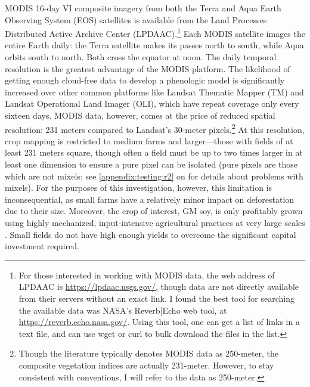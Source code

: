 MODIS 16-day VI composite imagery from both the Terra and Aqua Earth Observing System (EOS) satellites is available from the Land Processes Distributed Active Archive Center (LPDAAC).\footnote{For those interested in working with MODIS data, the web address of LPDAAC is \url{https://lpdaac.usgs.gov/}, though data are not directly available from their servers without an exact link. I found the best tool for searching the available data was NASA’s Reverb|Echo web tool, at \url{https://reverb.echo.nasa.gov/}. Using this tool, one can get a list of links in a text file, and can use wget or curl to bulk download the files in the list.} Each MODIS satellite images the entire Earth daily: the Terra satellite makes its passes north to south, while Aqua orbits south to north. Both cross the equator at noon. The daily temporal resolution is the greatest advantage of the MODIS platform. The likelihood of getting enough cloud-free data to develop a phenologic model is significantly increased over other common platforms like Landsat Thematic Mapper (TM) and Landsat Operational Land Imager (OLI), which have repeat coverage only every sixteen days. MODIS data, however, comes at the price of reduced spatial resolution: 231 meters compared to Landsat’s 30-meter pixels.\footnote{Though the literature typically denotes MODIS data as 250-meter, the composite vegetation indices are actually 231-meter. However, to stay consistent with conventions, I will refer to the data as 250-meter.} At this resolution, crop mapping is restricted to medium farms and larger---those with fields of at least 231 meters square, though often a field must be up to two times larger in at least one dimension to ensure a pure pixel can be isolated (pure pixels are those which are not mixels; see \autoref{appendix:testing:r2} on  for details about problems with mixels). For the purposes of this investigation, however, this limitation is inconsequential, as small farms have a relatively minor impact on deforestation due to their size. Moreover, the crop of interest, GM soy, is only profitably grown using highly mechanized, input-intensive agricultural practices at very large scales \autocite{kaimowitz2001soybean}. Small fields do not have high enough yields to overcome the significant capital investment required.

